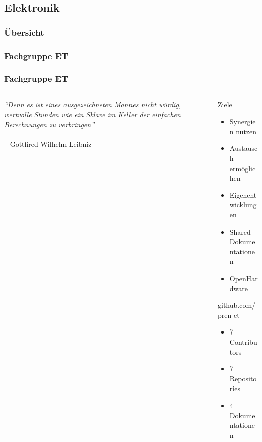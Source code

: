 \subsection{Elektronik}

\author{Ervin Mazlagi\'c}

\begin{frame}
	\frametitle{Übersicht\hfill{}\footnotesize \group}
\end{frame}

\subsubsection{Fachgruppe ET}
\begin{frame}
	\frametitle{Fachgruppe ET\hfill{}\footnotesize \group}
	\begin{columns}
		\begin{column}{0.5\textwidth}
				\textit{``Denn es ist eines ausgezeichneten
					Mannes nicht würdig, wertvolle Stunden
					wie ein Sklave im Keller der einfachen
					Berechnungen zu verbringen''}
				~ \\ ~ \\
				\hfill{} -- Gottfired Wilhelm Leibniz
		\end{column}
		\begin{column}{0.5\textwidth}
			\begin{block}{Ziele}
				\begin{itemize}
					\item Synergien nutzen
					\item Austausch ermöglichen
					\item Eigenentwicklungen
					\item Shared-Dokumentationen
					\item OpenHardware
				\end{itemize}
			\end{block}
			\begin{exampleblock}{github.com/pren-et}
				\begin{itemize}
					\item 7 Contributors
					\item 7 Repositories
					\item 4 Dokumentationen
				\end{itemize}
			\end{exampleblock}
		\end{column}
	\end{columns}
\end{frame}

